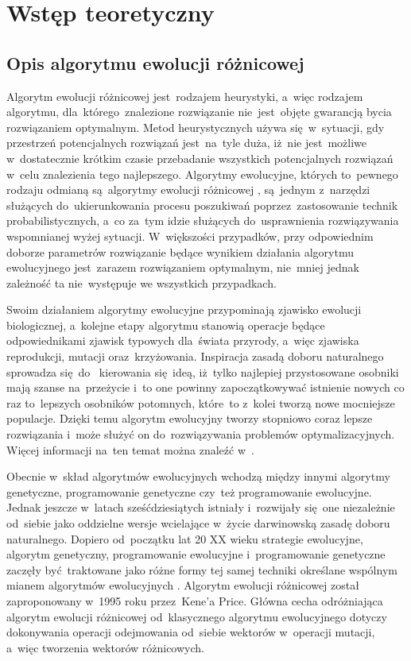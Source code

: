 \chapter{Wstęp teoretyczny}\label{cha:pierwszyDokument}


\section{Opis algorytmu ewolucji różnicowej}\label{sec:strukturaDokumentu}


Algorytm ewolucji różnicowej jest~rodzajem heurystyki, a~więc rodzajem algorytmu, dla~którego~znalezione rozwiązanie nie~jest~objęte gwarancją bycia rozwiązaniem optymalnym. Metod heurystycznych używa się~w~sytuacji, gdy przestrzeń potencjalnych rozwiązań jest~na~tyle duża, iż~nie jest~możliwe w~dostatecznie krótkim czasie przebadanie wszystkich potencjalnych rozwiązań w~celu znalezienia tego najlepszego. Algorytmy ewolucyjne, których to~pewnego rodzaju odmianą są~algorytmy ewolucji różnicowej \cite{diff}, są~jednym z~narzędzi służących do~ukierunkowania procesu poszukiwań poprzez~zastosowanie technik probabilistycznych, a~co za~tym idzie służących do~usprawnienia rozwiązywania wspomnianej wyżej sytuacji. W~większości przypadków, przy odpowiednim doborze parametrów rozwiązanie będące wynikiem działania algorytmu ewolucyjnego jest~zarazem rozwiązaniem optymalnym, nie~mniej jednak zależność ta nie~występuje we wszystkich przypadkach.

Swoim działaniem algorytmy ewolucyjne przypominają zjawisko ewolucji biologicznej, a~kolejne etapy algorytmu stanowią operacje będące odpowiednikami zjawisk typowych dla~świata przyrody, a~więc zjawiska reprodukcji, mutacji oraz~krzyżowania. Inspiracja zasadą doboru naturalnego sprowadza się~do~ kierowania się~ideą, iż~tylko najlepiej przystosowane osobniki mają szanse na~przeżycie i~to one powinny zapoczątkowywać istnienie nowych co raz to~lepszych osobników potomnych, które~to z~kolei tworzą nowe mocniejsze populacje. Dzięki temu algorytm ewolucyjny tworzy stopniowo coraz lepsze rozwiązania i~może służyć on do~rozwiązywania problemów optymalizacyjnych. Więcej informacji na~ten temat można znaleźć w~\cite{zeszyty}.

Obecnie w~skład algorytmów ewolucyjnych wchodzą między innymi algorytmy genetyczne, programowanie genetyczne czy~też programowanie ewolucyjne. Jednak jeszcze w~latach sześćdziesiątych istniały i~rozwijały się~one niezależnie od~siebie jako oddzielne wersje wcielające w~życie darwinowską zasadę doboru naturalnego. Dopiero od~początku lat 20 XX wieku strategie ewolucyjne, algorytm genetyczny, programowanie ewolucyjne i~programowanie genetyczne zaczęły być~traktowane jako różne formy tej samej techniki określane wspólnym mianem algorytmów ewolucyjnych \cite{doktorat}.  Algorytm ewolucji różnicowej został zaproponowany w~1995 roku przez~Kene'a Price. Główna cecha odróżniająca algorytm ewolucji różnicowej od~klasycznego algorytmu ewolucyjnego dotyczy dokonywania operacji odejmowania od~siebie wektorów w~operacji mutacji, a~więc tworzenia wektorów różnicowych.

